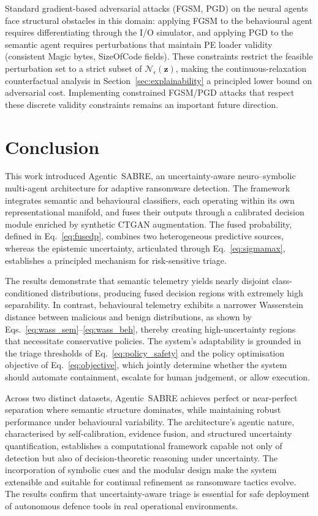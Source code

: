 \documentclass[3p]{elsarticle}
\begin{document}
\begin{changedblock}
Standard gradient-based adversarial attacks (FGSM, PGD) on the neural agents face structural obstacles in this domain: applying FGSM to the behavioural agent requires differentiating through the I/O simulator, and applying PGD to the semantic agent requires perturbations that maintain PE loader validity (consistent Magic bytes, SizeOfCode fields). These constraints restrict the feasible perturbation set to a strict subset of $\mathcal{N}_\epsilon(\mathbf{z})$, making the continuous-relaxation counterfactual analysis in Section~\ref{sec:explainability} a principled lower bound on adversarial cost. Implementing constrained FGSM/PGD attacks that respect these discrete validity constraints remains an important future direction.
\end{changedblock}

\section{Conclusion}
\label{sec:conclusion}

This work introduced Agentic~SABRE, an uncertainty-aware neuro–symbolic multi-agent architecture for adaptive ransomware detection. The framework integrates semantic and behavioural classifiers, each operating within its own representational manifold, and fuses their outputs through a calibrated decision module enriched by synthetic CTGAN augmentation. The fused probability, defined in Eq.~\eqref{eq:fusedp}, combines two heterogeneous predictive sources, whereas the epistemic uncertainty, articulated through Eq.~\eqref{eq:sigmamax}, establishes a principled mechanism for risk-sensitive triage.

The results demonstrate that semantic telemetry yields nearly disjoint class-conditioned distributions, producing fused decision regions with extremely high separability. In contrast, behavioural telemetry exhibits a narrower Wasserstein distance between malicious and benign distributions, as shown by Eqs.~\eqref{eq:wass_sem}--\eqref{eq:wass_beh}, thereby creating high-uncertainty regions that necessitate conservative policies. The system’s adaptability is grounded in the triage thresholds of Eq.~\eqref{eq:policy_safety} and the policy optimisation objective of Eq.~\eqref{eq:objective}, which jointly determine whether the system should automate containment, escalate for human judgement, or allow execution.

Across two distinct datasets, Agentic~SABRE achieves perfect or near-perfect separation where semantic structure dominates, while maintaining robust performance under behavioural variability. The architecture's agentic nature, characterised by self-calibration, evidence fusion, and structured uncertainty quantification, establishes a computational framework capable not only of detection but also of decision-theoretic reasoning under uncertainty. The incorporation of symbolic cues and the modular design make the system extensible and suitable for continual refinement as ransomware tactics evolve. The results confirm that uncertainty-aware triage is essential for safe deployment of autonomous defence tools in real operational environments.
\end{document}
